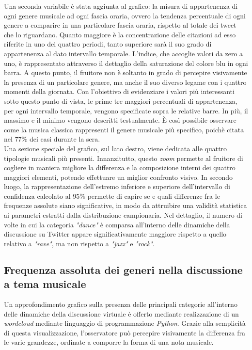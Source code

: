 \documentclass[12pt, a4paper, twocolumn]{article} %
\begin{document}
Una seconda variabile è stata aggiunta al grafico: la misura di appartenenza di ogni genere musicale ad ogni fascia oraria, ovvero la tendenza percentuale di ogni genere a comparire in una particolare fascia oraria, rispetto al totale dei tweet che lo riguardano. Quanto maggiore è la concentrazione delle citazioni ad esso riferite in uno dei quattro periodi, tanto superiore sarà il suo grado di appartenenza al dato intervallo temporale. L'indice, che accoglie valori da zero a uno, è rappresentato attraverso il dettaglio della saturazione del colore blu in ogni barra. A questo punto, il fruitore non è soltanto in grado di percepire visivamente la presenza di un particolare genere, ma anche il suo diverso legame con i quattro momenti della giornata. Con l'obiettivo di evidenziare i valori più interessanti sotto questo punto di vista, le prime tre maggiori percentuali di appartenenza, per ogni intervallo temporale, vengono specificate sopra le relative barre. In più, il massimo e il minimo vengono descritti testualmente. È così possibile osservare come la musica classica rappresenti il genere musicale più specifico, poichè citata nel 77\% dei casi durante la sera.\\
Una sezione speciale del grafico, sul lato destro, viene dedicata alle quattro tipologie musicali più presenti. Innanzitutto, questo \textit{zoom} permette al fruitore di cogliere in maniera migliore la differenza e la composizione interni dei quattro maggiori elementi, potendo effettuare un miglior confronto visivo. In secondo luogo, la rappresentazione dell'estremo inferiore e superiore dell'intervallo di confidenza calcolato al 95\% permette di capire se e quali differenze fra le frequenze assolute siano significative, in modo da attruibire una validità statistica ai parametri estratti dalla distribuzione campionaria. Nel dettaglio, il numero di volte in cui la categoria \textit{"dance"} è comparsa all'interno delle dinamiche della discussione su Twitter appare significativamente maggiore rispetto a quello relativo a \textit{"rave"}, ma non rispetto a \textit{"jazz"} e \textit{"rock"}. 

\subsection{Frequenza assoluta dei generi nella discussione a tema musicale}
Un approfondimento grafico sulla presenza delle principali categorie all'interno delle dinamiche della discussione virtuale è offerto mediante realizzazione di un \textit{wordcloud} mediante linguaggio di programmazione \textit{Python}. Grazie alla semplicità di questa visualizzazione, l'osservatore può percepire visivamente la differenza fra le varie grandezze, ordinate a comporre la forma di una nota musicale. 
\end{document}
